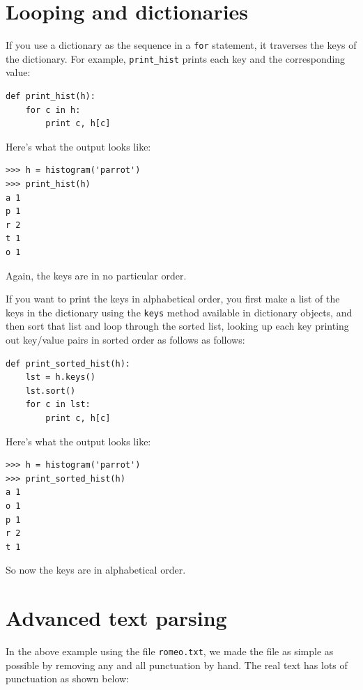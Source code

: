 \documentclass[10pt]{book}
\begin{document}
\section{Looping and dictionaries}


If you use a dictionary as the sequence 
in a {\tt for} statement, it traverses
the keys of the dictionary.  For example, \verb"print_hist"
prints each key and the corresponding value:

\beforeverb
\begin{verbatim}
def print_hist(h):
    for c in h:
        print c, h[c]
\end{verbatim}
\afterverb
%
Here's what the output looks like:

\beforeverb
\begin{verbatim}
>>> h = histogram('parrot')
>>> print_hist(h)
a 1
p 1
r 2
t 1
o 1
\end{verbatim}
\afterverb
%
Again, the keys are in no particular order.

If you want to print the keys in alphabetical order, you first 
make a list of the keys in the dictionary using the 
{\tt keys} method available in dictionary objects,
and then sort that list
and loop through the sorted list, looking up each
key printing out key/value pairs in sorted order as follows
as follows:

\beforeverb
\begin{verbatim}
def print_sorted_hist(h):
    lst = h.keys()
    lst.sort()
    for c in lst:
        print c, h[c]
\end{verbatim}
\afterverb
%
Here's what the output looks like:

\beforeverb
\begin{verbatim}
>>> h = histogram('parrot')
>>> print_sorted_hist(h)
a 1
o 1
p 1
r 2
t 1
\end{verbatim}
\afterverb
%
So now the keys are in alphabetical order.

\section{Advanced text parsing}

In the above example using the file {\tt romeo.txt},
we made the file as simple as possible by removing 
any and all punctuation by hand.  The real text 
has lots of punctuation as shown below:
\end{document}
